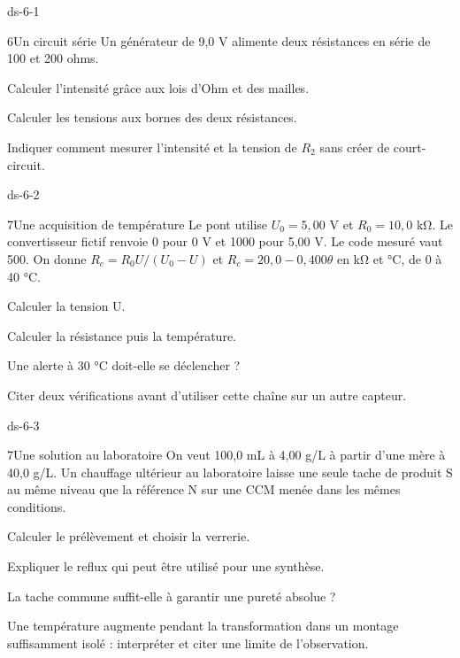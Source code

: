 \begin{blocLivre}{ds-6-1}\begin{exoBac}{6}{Un circuit série}
Un générateur de 9,0 V alimente deux résistances en série de 100 et 200 ohms.
\begin{questions}
\item Calculer l’intensité grâce aux lois d’Ohm et des mailles.
\item Calculer les tensions aux bornes des deux résistances.
\item Indiquer comment mesurer l’intensité et la tension de $R_2$ sans créer de court-circuit.
\end{questions}
\end{exoBac}\end{blocLivre}
\begin{blocLivre}{ds-6-2}\begin{exoBac}{7}{Une acquisition de température}
Le pont utilise $U_0=5,00$ V et $R_0=10,0$ kΩ. Le convertisseur fictif renvoie 0 pour 0 V et 1000 pour 5,00 V. Le code mesuré vaut 500. On donne $R_c=R_0U/(U_0-U)$ et $R_c=20,0-0,400\theta$ en kΩ et °C, de 0 à 40 °C.
\begin{questions}
\item Calculer la tension U.
\item Calculer la résistance puis la température.
\item Une alerte à 30 °C doit-elle se déclencher ?
\item Citer deux vérifications avant d’utiliser cette chaîne sur un autre capteur.
\end{questions}
\end{exoBac}\end{blocLivre}
\begin{blocLivre}{ds-6-3}\begin{exoBac}{7}{Une solution au laboratoire}
On veut 100,0 mL à 4,00 g/L à partir d’une mère à 40,0 g/L. Un chauffage ultérieur au laboratoire laisse une seule tache de produit S au même niveau que la référence N sur une CCM menée dans les mêmes conditions.
\begin{questions}
\item Calculer le prélèvement et choisir la verrerie.
\item Expliquer le reflux qui peut être utilisé pour une synthèse.
\item La tache commune suffit-elle à garantir une pureté absolue ?
\item Une température augmente pendant la transformation dans un montage suffisamment isolé : interpréter et citer une limite de l’observation.
\end{questions}
\end{exoBac}\end{blocLivre}

